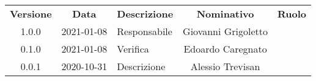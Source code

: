{
    \renewcommand{\arraystretch}{1.5}
    \centering
    \begin{longtable}{ c c  C{4cm}  c  c }
        \rowcolor{\primaryColor}
        \textcolor{\secondaryColor}{
        \textbf{Versione}}     & \textcolor{\secondaryColor}{\textbf{Data}}       & \textcolor{\secondaryColor}
        {\textbf{Descrizione}} & \textcolor{\secondaryColor}{\textbf{Nominativo}} & \textcolor{\secondaryColor}{\textbf{Ruolo}}                          \\


        1.0.0                  & 2021-01-08                                       & Responsabile                                & Giovanni Grigoletto & \responsabile{} \\
        0.1.0                  & 2021-01-08                                       & Verifica                                    & Edoardo Caregnato & \verificatore{} \\
        0.0.1                  & 2020-10-31                                      & Descrizione                           & Alessio Trevisan & \redattore{}    \\
    \end{longtable}
}